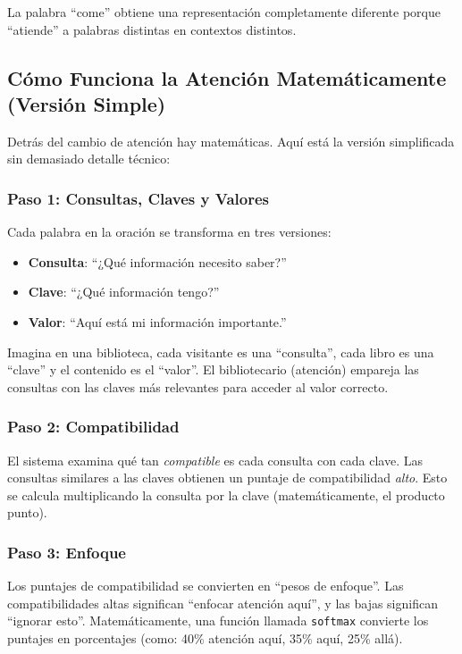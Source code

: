 \documentclass[11pt,a4paper]{article}
\begin{document}
La palabra ``come'' obtiene una representación completamente diferente porque ``atiende'' a palabras distintas en contextos distintos.

\subsection{Cómo Funciona la Atención Matemáticamente (Versión Simple)}

Detrás del cambio de atención hay matemáticas. Aquí está la versión simplificada sin demasiado detalle técnico:

\subsubsection{Paso 1: Consultas, Claves y Valores}

Cada palabra en la oración se transforma en tres versiones:
\begin{itemize}[leftmargin=*]
    \item \textbf{Consulta}: ``¿Qué información necesito saber?''
    \item \textbf{Clave}: ``¿Qué información tengo?''
    \item \textbf{Valor}: ``Aquí está mi información importante.''
\end{itemize}

Imagina en una biblioteca, cada visitante es una ``consulta'', cada libro es una ``clave'' y el contenido es el ``valor''. El bibliotecario (atención) empareja las consultas con las claves más relevantes para acceder al valor correcto.

\subsubsection{Paso 2: Compatibilidad}

El sistema examina qué tan \emph{compatible} es cada consulta con cada clave. Las consultas similares a las claves obtienen un puntaje de compatibilidad \emph{alto}. Esto se calcula multiplicando la consulta por la clave (matemáticamente, el producto punto).

\subsubsection{Paso 3: Enfoque}

Los puntajes de compatibilidad se convierten en ``pesos de enfoque''. Las compatibilidades altas significan ``enfocar atención aquí'', y las bajas significan ``ignorar esto''. Matemáticamente, una función llamada \texttt{softmax} convierte los puntajes en porcentajes (como: 40\% atención aquí, 35\% aquí, 25\% allá).
\end{document}
